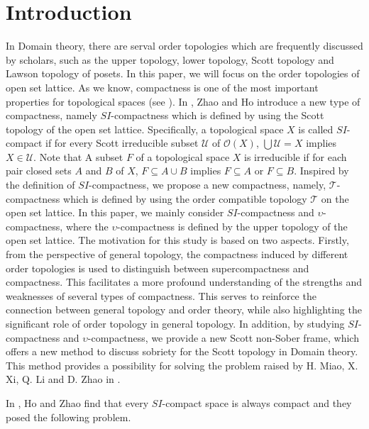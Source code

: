 \documentclass[preprint,12pt]{elsarticle}
\numberwithin{equation}{section}
\begin{document}
\renewcommand*\contentsname{\hfill Contents \hfill}
\tableofcontents

\section{Introduction}
\setlength{\parskip}{0.5\baselineskip}
\quad In Domain theory, there are serval order topologies which are frequently discussed by scholars, such as the upper topology, lower topology, Scott topology and Lawson topology of posets. In this paper, we will focus on the order topologies of open set lattice. As we know, compactness  is one  of the most important properties for topological spaces (see \cite{RE77}). In \cite{DME15}, Zhao and Ho introduce a new type of compactness, namely $SI$-compactness which is defined by using the Scott topology of the open set lattice. Specifically, a topological space $X$ is called $SI$-compact if for every Scott irreducible subset $\mathcal{U}$ of $\mathcal{O}(X)$, $\bigcup \mathcal{U}= X$ implies $X\in\mathcal{U}$. Note that A subset $F$ of a topological space $X$ is irreducible if for each pair closed sets $A$ and $B$ of $X$, $F\subseteq A\cup B$ implies $F\subseteq A$ or $F\subseteq B$. Inspired by the definition of $SI$-compactness, we propose a new
compactness, namely, $\mathcal{T}$-compactness which is defined by using the order compatible topology $\mathcal{T}$ on the open set lattice. In this paper, we mainly consider $SI$-compactness and $\upsilon$-compactness, where the $\upsilon$-compactness is defined by the upper topology of the open set lattice. The motivation for this study is based on two aspects. Firstly, from the perspective of general topology, the compactness induced by different order topologies is used to distinguish between supercompactness and compactness. This facilitates a more profound understanding of the strengths and weaknesses of several types of compactness. This serves to reinforce the connection between general topology and order theory, while also highlighting the significant role of order topology in general topology. In addition, by studying $SI$-compactness and $\upsilon$-compactness, we provide a new Scott non-Sober frame, which offers a new method to discuss sobriety for the Scott topology in Domain theory. This method provides a possibility for solving the problem raised by H. Miao, X. Xi, Q. Li and D. Zhao in \cite{AB75}.


\quad In \cite{DME15}, Ho and Zhao find that every $SI$-compact space is always compact and they posed the following problem.
\end{document}

